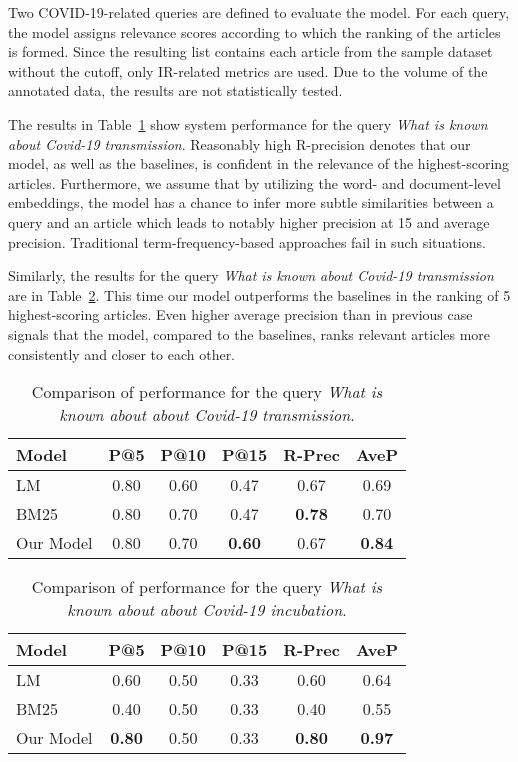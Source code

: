 \documentclass[10pt, a4paper]{article}
\begin{document}
Two COVID-19-related queries are defined to evaluate the model. For each query, the model assigns relevance scores according to which the ranking of the articles is formed. Since the resulting list contains each article from the sample dataset without the cutoff, only IR-related metrics are used. Due to the volume of the annotated data, the results are not statistically tested. 

The results in Table~\ref{tab:query1} show system performance for the query \textit{What is known about Covid-19 transmission}. Reasonably high R-precision denotes that our model, as well as the baselines, is confident in the relevance of the highest-scoring articles. Furthermore, we assume that by utilizing the word- and document-level embeddings, the model has a chance to infer more subtle similarities between a query and an article which leads to notably higher precision at 15 and average precision. Traditional term-frequency-based approaches fail in such situations.

Similarly, the results for the query \textit{What is known about Covid-19 transmission} are in Table~\ref{tab:query2}. This time our model outperforms the baselines in the ranking of 5 highest-scoring articles. Even higher average precision than in previous case signals that the model, compared to the baselines, ranks relevant articles more consistently and closer to each other.

\begin{table}
\caption{Comparison of performance for the query \textit{What is known about about Covid-19 transmission}.}
\label{tab:query1}
\begin{center}
\begin{tabular}{lccccc}
\toprule
Model & P@5 & P@10 & P@15 & R-Prec & AveP \\
\midrule
LM & 0.80 & 0.60 & 0.47 & 0.67 & 0.69  \\
BM25 & 0.80 & 0.70 & 0.47 & \textbf{0.78} & 0.70 \\
Our Model & 0.80 & 0.70 & \textbf{0.60} & 0.67 & \textbf{0.84} \\
\bottomrule
\end{tabular}
\end{center}
\end{table}

\begin{table}
\caption{Comparison of performance for the query \textit{What is known about about Covid-19 incubation}.}
\label{tab:query2}
\begin{center}
\begin{tabular}{lccccc}
\toprule
Model & P@5 & P@10 & P@15 & R-Prec & AveP \\
\midrule
LM & 0.60 & 0.50 & 0.33 & 0.60 & 0.64 \\
BM25 & 0.40 & 0.50 & 0.33 & 0.40 & 0.55 \\
Our Model & \textbf{0.80} & 0.50 & 0.33 & \textbf{0.80} & \textbf{0.97} \\
\bottomrule
\end{tabular}
\end{center}
\end{table}
\end{document}
